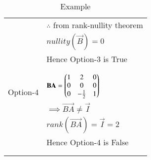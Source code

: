 \documentclass[journal,12pt]{IEEEtran}
\begin{document}
\begin{longtable}{|l|l|}
& $\therefore$ from rank-nullity theorem\\
& $nullity(\vec{B}) = 0$\\
& Hence Option-3 is True\\
&\\
\hline
\multirow{3}{*}{Option-4} & \\
& $\mathbf{BA} = \begin{pmatrix}1&2&0\\0&0&0\\0&-\frac{1}{2}&1\end{pmatrix}$\\
& $\implies \vec{BA} \neq \vec{I}$\\
& $rank(\vec{BA}) = \vec{I} = 2$\\
& Hence Option-4 is False\\
&\\
\hline
\caption{Example}
\label{table:2}
\end{longtable}
\end{document}
